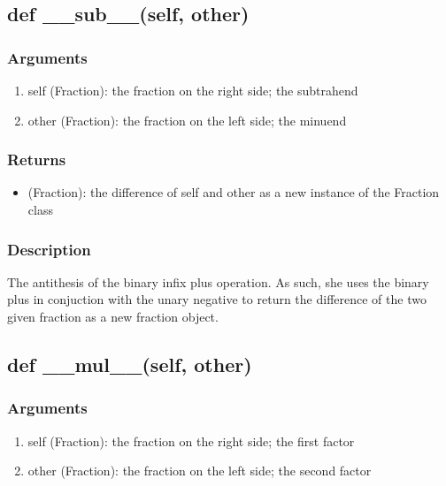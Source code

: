 \documentclass[refman]{scrartcl}
\begin{document}
\subsection{def \_\_sub\_\_(self, other)}

\subsubsection*{Arguments}

\begin{enumerate}
	\item self (Fraction): the fraction on the right side; the subtrahend
	\item other (Fraction): the fraction on the left side; the minuend
\end{enumerate}

\subsubsection*{Returns}

\begin{itemize}
	\item (Fraction): the difference of self and other as a new instance of the Fraction class
\end{itemize}

\subsubsection*{Description}

The antithesis of the binary infix plus operation. As such, she uses the binary plus in conjuction with the unary negative to return the difference of the two given fraction as a new fraction object.

\subsection{def \_\_mul\_\_(self, other)}

\subsubsection*{Arguments}

\begin{enumerate}
	\item self (Fraction): the fraction on the right side; the first factor
	\item other (Fraction): the fraction on the left side; the second factor
\end{enumerate}
\end{document}
